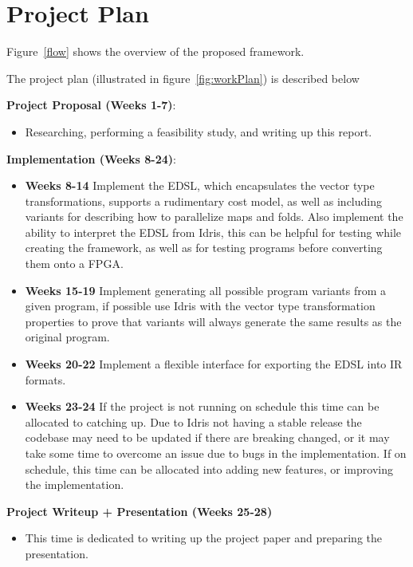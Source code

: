 \section{Project Plan}

Figure~\ref{flow} shows the overview of the proposed framework.

The project plan (illustrated in figure~\ref{fig:workPlan}) is described below

\textbf{Project Proposal (Weeks 1-7)}:
\begin{itemize}
\item Researching, performing a feasibility study, and writing up this report.
\end{itemize}

\textbf{Implementation (Weeks 8-24)}: 
\begin{itemize}
\item \textbf{Weeks 8-14} Implement the EDSL, which encapsulates the vector type transformations, supports
      a rudimentary cost model, as well as including variants for describing how to parallelize
      maps and folds. Also implement the ability to interpret the EDSL from Idris, this can
      be helpful for testing while creating the framework, as well as for
      testing programs before converting them onto a FPGA.

\item \textbf{Weeks 15-19} Implement generating all possible program variants from a given program,
      if possible use Idris with the vector type transformation properties to prove
      that variants will always generate the same results as the original program.

\item \textbf{Weeks 20-22} Implement a flexible interface for exporting the EDSL into IR formats.

\item \textbf{Weeks 23-24} If the project is not running on schedule this time can be allocated to catching up.
Due to Idris not having a stable release the codebase may need to be updated if there are breaking changed,
or it may take some time to overcome an issue due to bugs in the implementation. If on schedule, this time
can be allocated into adding new features, or improving the implementation.
\end{itemize}

\textbf{Project Writeup + Presentation (Weeks 25-28)}
\begin{itemize}
\item This time is dedicated to writing up the project paper and preparing 
the presentation.
\end{itemize}





